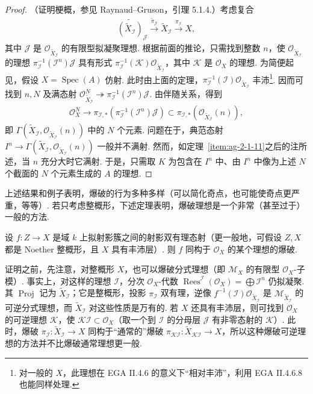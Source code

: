 \begin{proof}
（证明梗概，参见 Raynaud--Gruson，引理 5.1.4.）考虑复合
\begin{align*}
\widetilde{(\widetilde X_{\mathcal I})}_{\mathcal J}\xrightarrow{\widetilde\pi_{\mathcal J}}\widetilde X_{\mathcal I}\xrightarrow{\pi_{\mathcal I}}X,
\end{align*}
其中 $\mathcal J$ 是 $\mathcal O_{\widetilde X_{\mathcal I}}$ 的有限型拟凝聚理想. 根据前面的推论，只需找到整数 $n$，使 $\mathcal O_{\widetilde X_{\mathcal I}}$ 的理想 $\pi_{\mathcal I}^{-1}(\mathcal I^n)\mathcal J$ 具有形式 $\pi_{\mathcal I}^{-1}(\mathcal K)\mathcal O_{\widetilde X_{\mathcal I}}$，其中 $\mathcal K$ 是 $\mathcal O_X$ 的理想.
为简便起见，假设 $X=\operatorname{Spec}(A)$ 仿射. 此时由上面的定理，$\pi_{\mathcal I}^{-1}(\mathcal I)\mathcal O_{\widetilde X_{\mathcal I}}$ 丰沛\footnote{对一般的 $X$，此理想在 EGA II.4.6 的意义下``相对丰沛''，利用 EGA II.4.6.8 也能同样处理.}. 因而可找到 $n,N$ 及满态射 $\mathcal O_{\widetilde X_{\mathcal I}}^N\twoheadrightarrow\pi_{\mathcal I}^{-1}(\mathcal I^n)\mathcal J$. 由伴随关系，得到
\begin{align*}
\mathcal O_X^N\longrightarrow\pi_{\mathcal I,*}(\pi_{\mathcal I}^{-1}(\mathcal I^n)\mathcal J)\subset\pi_{\mathcal I,*}(\mathcal O_{\widetilde X_{\mathcal I}}(n)),
\end{align*}
即 $\Gamma(\widetilde X_{\mathcal I},\mathcal O_{\widetilde X_{\mathcal I}}(n))$ 中的 $N$ 个元素. 问题在于，典范态射 $I^n\longrightarrow\Gamma(\widetilde X_{\mathcal I},\mathcal O_{\widetilde X_{\mathcal I}}(n))$ 一般并不满射. 然而，如定理~\ref{item:ag-2-1-11}之后的注所述，当 $n$ 充分大时它满射. 于是，只需取 $K$ 为包含在 $I^n$ 中、由 $I^n$ 中像为上述 $N$ 个截面的 $N$ 个元素生成的 $A$ 的理想.
\end{proof}
上述结果和例子表明，爆破的行为多种多样（可以简化奇点，也可能使奇点更严重，等等）. 若只考虑整概形，下述定理表明，爆破理想是一个非常（甚至过于）一般的方法.
\begin{theorem}\label{item:ag-2-2-15}
设 $f:Z\longrightarrow X$ 是域 $k$ 上拟射影簇之间的射影双有理态射（更一般地，可假设 $Z,X$ 都是 Noether 整概形，且 $X$ 具有丰沛层）. 则 $f$ 同构于 $\mathcal O_X$ 的某个理想的爆破.
\end{theorem}
证明之前，先注意，对整概形 $X$，也可以爆破分式理想（即 $\mathcal M_X$ 的有限型 $\mathcal O_X$-子模）. 事实上，对这样的理想 $\mathcal I$，分次 $\mathcal O_X$-代数 $\operatorname{Rees}^{\mathcal I}(\mathcal O_X)=\bigoplus\mathcal I^n$ 仍拟凝聚. 其 $\operatorname{Proj}$ 记为 $\widetilde X_{\mathcal I}$；它是整概形，投影 $\pi_{\mathcal I}$ 双有理，逆像 $f^{-1}(\mathcal I)\mathcal O_{\widetilde X_{\mathcal I}}$ 是 $\mathcal M_{\widetilde X_{\mathcal I}}$ 的可逆分式理想，而 $\widetilde X_{\mathcal I}$ 对这些性质是万有的. 若 $X$ 还具有丰沛层，则可找到 $\mathcal O_X$ 的可逆理想 $\mathcal K$，使 $\mathcal K\mathcal I\subset\mathcal O_X$（取一个到 $\mathcal I$ 的分母层 $\mathcal J$ 有非零态射的 $\mathcal K$）. 此时，爆破 $\pi_{\mathcal I}:\widetilde X_{\mathcal I}\longrightarrow X$ 同构于``通常的''爆破 $\pi_{\mathcal K\mathcal I}:\widetilde X_{\mathcal K\mathcal I}\longrightarrow X$，所以这种爆破可逆理想的方法并不比爆破通常理想更一般.
